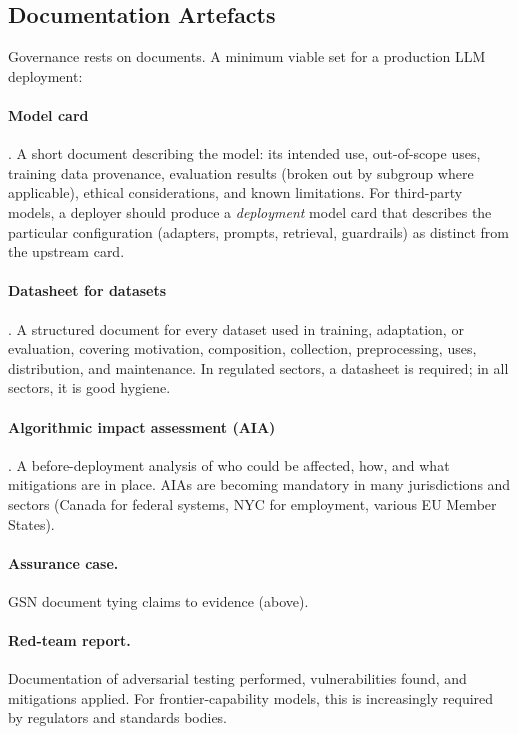 \subsection{Documentation Artefacts}

Governance rests on documents. A minimum viable set for a
production LLM deployment:

\paragraph{Model card} \citep{mitchell2019modelcards}. A short
document describing the model: its intended use, out-of-scope
uses, training data provenance, evaluation results (broken out
by subgroup where applicable), ethical considerations, and
known limitations. For third-party models, a deployer should
produce a \emph{deployment} model card that describes the
particular configuration (adapters, prompts, retrieval,
guardrails) as distinct from the upstream card.

\paragraph{Datasheet for datasets}
\citep{gebru2021datasheets}. A structured document for every
dataset used in training, adaptation, or evaluation, covering
motivation, composition, collection, preprocessing, uses,
distribution, and maintenance. In regulated sectors, a
datasheet is required; in all sectors, it is good hygiene.

\paragraph{Algorithmic impact assessment (AIA)}
\citep{metcalf2021algorithmic}. A before-deployment analysis of
who could be affected, how, and what mitigations are in place.
AIAs are becoming mandatory in many jurisdictions and sectors
(Canada for federal systems, NYC for employment, various EU
Member States).

\paragraph{Assurance case.} GSN document tying claims to
evidence (above).

\paragraph{Red-team report.} Documentation of adversarial testing
performed, vulnerabilities found, and mitigations applied. For
frontier-capability models, this is increasingly required by
regulators and standards bodies.

